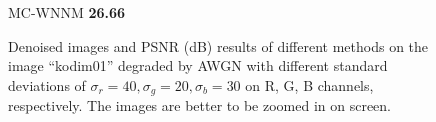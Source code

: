 \begin{figure}
{\begin{minipage}[t]{0.19\textwidth}
{\footnotesize MC-WNNM \textbf{26.66}}
\end{minipage}
}
\caption{Denoised images and PSNR (dB) results of different methods on the image ``kodim01'' degraded by AWGN with different standard deviations of $\sigma_{r}=40, \sigma_{g}=20, \sigma_{b}=30$ on R, G, B channels, respectively. The images are better to be zoomed in on screen.}
    \label{fig4-2}
\end{figure}

\begin{figure}
    \centering
{}
\end{figure}
